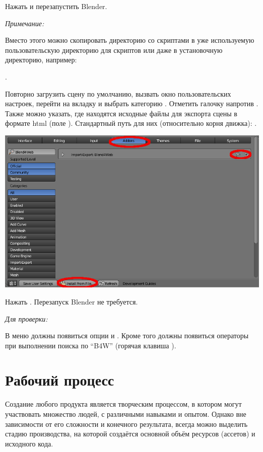 \documentclass[a4paper,12pt,oneside]{sphinxmanual}
\begin{document}
Нажать  и перезапустить Blender.

\emph{Примечание:}

Вместо этого можно скопировать директорию со скриптами  в уже используемую пользовательскую директорию для скриптов или даже в установочную директорию, например:

.

Повторно загрузить сцену по умолчанию, вызвать окно пользовательских настроек, перейти на вкладку  и выбрать категорию . Отметить галочку напротив .
Также можно указать, где находятся исходные файлы для экспорта сцены в формате html (поле ). Стандартный путь для них (относительно корня движка): .

{\hfill\includegraphics[width=1.000\linewidth]{user_preferences_enable_addon.jpg}\hfill}

Нажать . Перезапуск Blender не требуется.

\emph{Для проверки:}

В меню  должны появиться опции  и . Кроме того должны появиться операторы при выполнении поиска по ``B4W'' (горячая клавиша ).


\chapter{Рабочий процесс}
\label{working_process_stages::doc}\label{working_process_stages:working-process-stages}\label{working_process_stages:id1}
Создание любого продукта является творческим процессом, в котором могут
участвовать множество людей, с различными навыками и опытом. Однако вне
зависимости от его сложности и конечного результата, всегда можно выделить
стадию производства, на которой создаётся основной объём ресурсов (ассетов) и
исходного кода.
\end{document}
